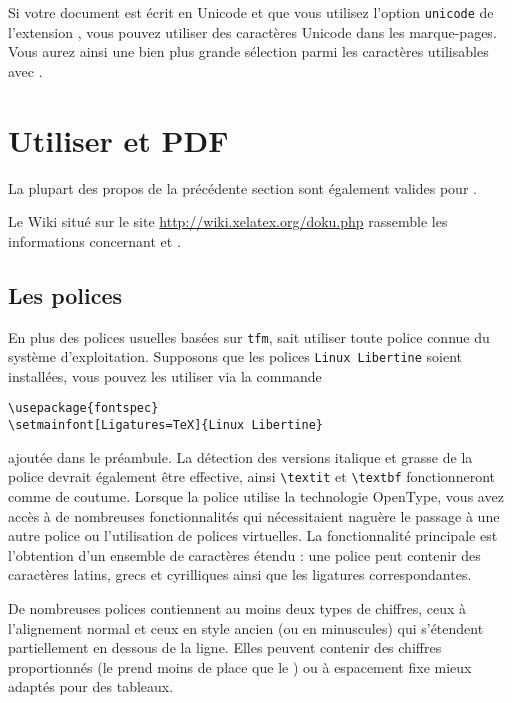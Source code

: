 Si votre document est écrit en Unicode et que vous utilisez l'option
\verb+unicode+ de l'extension , vous pouvez utiliser des
caractères Unicode dans les marque-pages. Vous aurez ainsi une bien
plus grande sélection parmi les caractères utilisables avec
.

\section{Utiliser  et PDF}
\label{sec:xetex}

%

La plupart des propos de la précédente section sont également valides
pour .

Le Wiki situé sur le site \url{http://wiki.xelatex.org/doku.php}
rassemble les informations concernant  et .

\subsection{Les polices}

En plus des polices usuelles basées sur \texttt{tfm}, 
sait utiliser toute police connue du système d'exploitation. Supposons
que les polices \texttt{Linux Libertine} soient installées, vous
pouvez les utiliser via la commande
\begin{code}
\begin{verbatim}
\usepackage{fontspec}
\setmainfont[Ligatures=TeX]{Linux Libertine}
\end{verbatim}
\end{code}
%
ajoutée dans le préambule. La détection des versions italique et
grasse de la police devrait également être effective, ainsi
\verb|\textit| et \verb|\textbf| fonctionneront comme de
coutume. Lorsque la police utilise la technologie OpenType, vous avez
accès à de nombreuses fonctionnalités qui nécessitaient naguère le
passage à une autre police ou l'utilisation de polices virtuelles. La
fonctionnalité principale est l'obtention d'un ensemble de caractères
étendu : une police peut contenir des caractères latins, grecs et
cyrilliques ainsi que les ligatures correspondantes.

De nombreuses polices contiennent au moins deux types de chiffres,
ceux à l'alignement normal et ceux en style ancien (ou en minuscules)
qui s'étendent partiellement en dessous de la ligne. Elles peuvent
contenir des chiffres proportionnés (le  \fg prend moins de place
que le  \fg) ou à espacement fixe mieux adaptés pour des tableaux.

